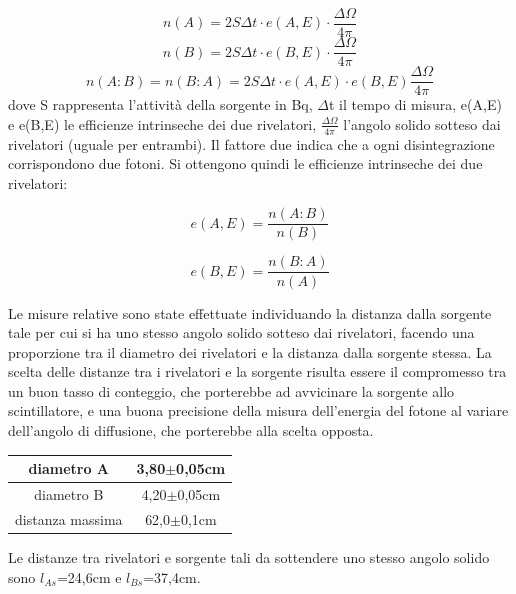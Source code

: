 \documentclass[italian,11pt]{report}
\begin{document}
\[ n(A)=2S\Delta t  \cdot e(A,E) \cdot \frac{\Delta \Omega}{4 \pi} \]
\[ n(B)=2S\Delta t  \cdot e(B,E) \cdot \frac{\Delta \Omega}{4 \pi} \]
\[ n(A:B)=n(B:A)=2S\Delta t  \cdot e(A,E) \cdot e(B,E)\frac{\Delta \Omega}{4 \pi} \]
dove S rappresenta l'attività della sorgente in Bq, $\Delta$t il tempo di misura, e(A,E) e e(B,E) le efficienze intrinseche dei due rivelatori, $\frac{\Delta \Omega}{4 \pi}$ l'angolo solido sotteso dai rivelatori (uguale per entrambi). Il fattore due indica che a ogni disintegrazione corrispondono due fotoni. Si ottengono quindi le efficienze intrinseche dei due rivelatori:

\[ e(A,E)=\frac{n(A:B)}{n(B)} \]

\[ e(B,E)=\frac{n(B:A)}{n(A)} \]

Le misure relative sono state effettuate individuando la distanza dalla sorgente tale per cui si ha uno stesso angolo solido sotteso dai rivelatori, facendo una proporzione tra il diametro dei rivelatori e la distanza dalla sorgente stessa. 
 La scelta delle distanze tra i rivelatori e la sorgente risulta essere il compromesso tra un buon tasso di conteggio, che porterebbe ad avvicinare la sorgente allo scintillatore, e una buona precisione della misura dell'energia del fotone al variare dell'angolo di diffusione, che porterebbe alla scelta opposta. 

\begin{center}
    \centering
    \begin{tabular}{cc}
    \hline
    diametro A & 3,80$\pm$0,05cm \\
    \hline
    diametro B & 4,20$\pm$0,05cm \\
    \hline
    distanza massima & 62,0$\pm$0,1cm\\
    \hline
    \end{tabular}
    \end{center}

Le distanze tra rivelatori e sorgente tali da sottendere uno stesso angolo solido sono $l_{As}$=24,6cm e $l_{Bs}$=37,4cm.
\end{document}
